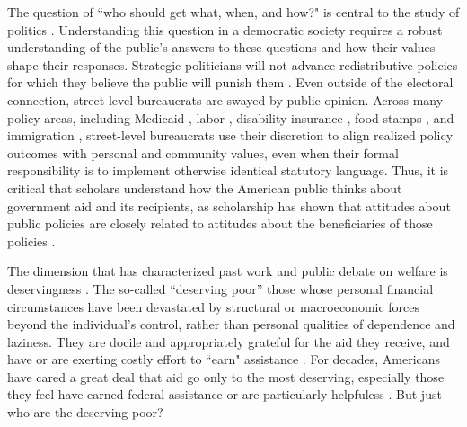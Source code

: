 \documentclass[12pt]{article}%
\begin{document}
\begin{doublespace}

The question of ``who should get what, when, and how?" is central to the study of politics \citep{lasswell2018politics}. Understanding this question in a democratic society requires a robust understanding of the public’s answers to these questions and how their values shape their responses. Strategic politicians will not advance redistributive policies for which they believe the public will punish them \citep{fearon1999electoral}. Even outside of the electoral connection, street level bureaucrats are swayed by public opinion. Across many policy areas, including Medicaid \citep{weissert1994beyond}, labor \citep{schmidt2002politicization}, disability insurance \citep{keiser1999state}, food stamps \citep{kogan_welfare_2021}, and immigration \citep{lewis2013some}, street-level bureaucrats use their discretion to align realized policy outcomes with personal and community values, even when their formal responsibility is to implement otherwise identical statutory language. Thus, it is critical that scholars understand how the American public thinks about government aid and its recipients, as scholarship has shown that attitudes about public policies are closely related to attitudes about the beneficiaries of those policies \citep{nelson1996issue, rabinowitz2009white, fossati2018wants}.

The dimension that has characterized past work and public debate on welfare is deservingness \citep{schneider_social_1993,  van2017social, gilens_why_2000, petersen2012social, petersen2012deserves, aaroe2014crowding}. The so-called ``deserving poor” those whose personal financial circumstances have been devastated by structural or macroeconomic forces beyond the individual’s control, rather than personal qualities of dependence and laziness. They are docile and appropriately grateful for the aid they receive, and have or are exerting costly effort to ``earn" assistance \citep{van_oorschot_who_nodate}. For decades, Americans have cared a great deal that aid go only to the most deserving, especially those they feel have earned federal assistance or are particularly helpfuless \citep{bobocel_justice-based_1998, katz_racial_1988, sniderman_symbolic_1986, sniderman_beyond_1996, mclosky_ethos}. But just who are the deserving poor?


\end{doublespace}
\end{document}
